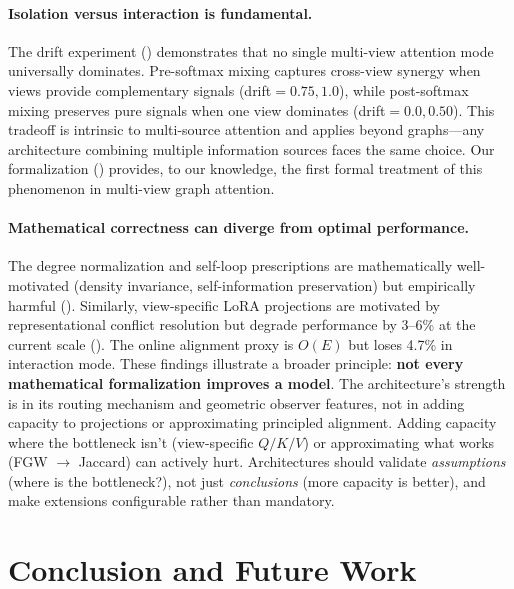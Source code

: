 \documentclass[11pt,a4paper]{article}
\begin{document}
\paragraph{Isolation versus interaction is fundamental.}
The drift experiment () demonstrates that no single
multi-view attention mode universally dominates.
Pre-softmax mixing captures cross-view synergy when views provide
complementary signals (drift${}=0.75, 1.0$), while post-softmax mixing
preserves pure signals when one view dominates (drift${}=0.0, 0.50$).
This tradeoff is intrinsic to multi-source attention and applies beyond
graphs---any architecture combining multiple information sources faces
the same choice.
Our formalization () provides, to our knowledge,
the first formal treatment of this phenomenon in multi-view graph
attention.

\paragraph{Mathematical correctness can diverge from optimal
performance.}
The degree normalization and self-loop prescriptions are mathematically
well-motivated (density invariance, self-information preservation) but
empirically harmful ().
Similarly, view-specific LoRA projections are motivated by
representational conflict resolution but degrade performance by 3--6\%
at the current scale ().
The online alignment proxy is $O(E)$ but loses 4.7\% in interaction mode.
These findings illustrate a broader principle: \textbf{not every
mathematical formalization improves a model}.
The architecture's strength is in its routing mechanism and geometric
observer features, not in adding capacity to projections or
approximating principled alignment.
Adding capacity where the bottleneck isn't (view-specific $Q/K/V$) or
approximating what works (FGW $\to$ Jaccard) can actively hurt.
Architectures should validate \emph{assumptions} (where is the
bottleneck?), not just \emph{conclusions} (more capacity is better),
and make extensions configurable rather than mandatory.

\section{Conclusion and Future Work}
\label{sec:conclusion}
\end{document}
